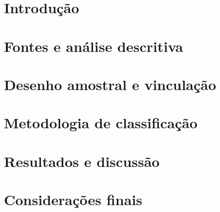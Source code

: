 \documentclass[12pt,a4paper,twoside]{article}
\numberwithin{equation}{section}
\begin{document}
\hypersetup{pageanchor=false}


\clearpage{}
\onehalfspacing

\clearpage
\begingroup\small\singlespacing
\listoftables
\clearpage
\listoffigures
\endgroup
\clearpage\tableofcontents
\clearpage{}\hypersetup{pageanchor=true}
\section{Introdução}\label{sec:introducao}

\section{Fontes e análise descritiva}\label{sec:fontes}

\section{Desenho amostral e vinculação}\label{sec:amostragem}

\section{Metodologia de classificação}\label{sec:metodologia}

\section{Resultados e discussão}\label{sec:resultados}

\section{Considerações finais}\label{sec:conclusao}

\clearpage{}

\begingroup\small\singlespacing\raggedright

\endgroup
\end{document}
